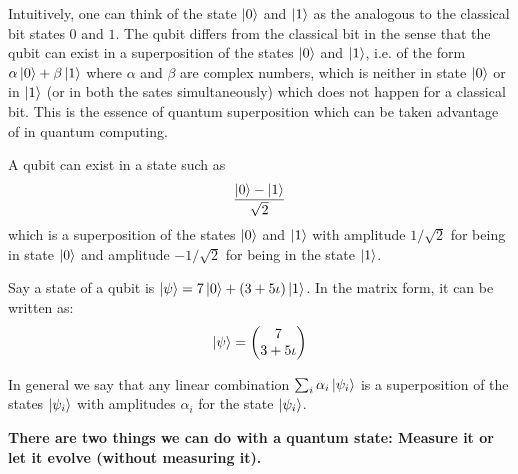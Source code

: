 Intuitively, one can think of the state $\ket{0}$ and $\ket{1}$ as the analogous to the classical bit states $0$ and $1$. 
The qubit differs from the classical bit in the sense that the qubit can exist in a superposition of the states $\ket{0}$ and $\ket{1}$,
i.e. of the form $\alpha\ket{0}+\beta\ket{1}$ where $\alpha$ and $\beta$ are complex numbers, which is neither in state $\ket{0}$ or in $\ket{1}$ (or in both the sates 
simultaneously)  which does not happen for a classical bit. This is the essence of quantum superposition which can be taken advantage of in quantum computing.

\begin{example}
    A qubit can exist in a state such as 
    \[\dfrac{\ket{0}-\ket{1}}{\sqrt{2}}\]
    which is a superposition of the states $\ket{0}$ and $\ket{1}$ with amplitude $1/\sqrt{2}$ for being in state $\ket{0}$ and 
    amplitude $-1/\sqrt{2}$ for being in the state $\ket{1}$.
\end{example}
\begin{example}
    Say a state of a qubit is $\ket{\psi}=7\ket{0}+(3+5\iota)\ket{1}$. In the matrix form, it can be written as:
    \[
        \ket{\psi}=\begin{pmatrix} 7 \\ 3+5\iota \end{pmatrix}
    \]
\end{example}

In general we say that any linear combination $\sum_i \alpha_i \ket{\psi_i}$ is a superposition of the states $\ket{\psi_i}$ with amplitudes 
$\alpha_i$ for the state $\ket{\psi_i}$.

\textbf{There are two things we can do with a quantum state: Measure it or let it evolve (without measuring it).}

